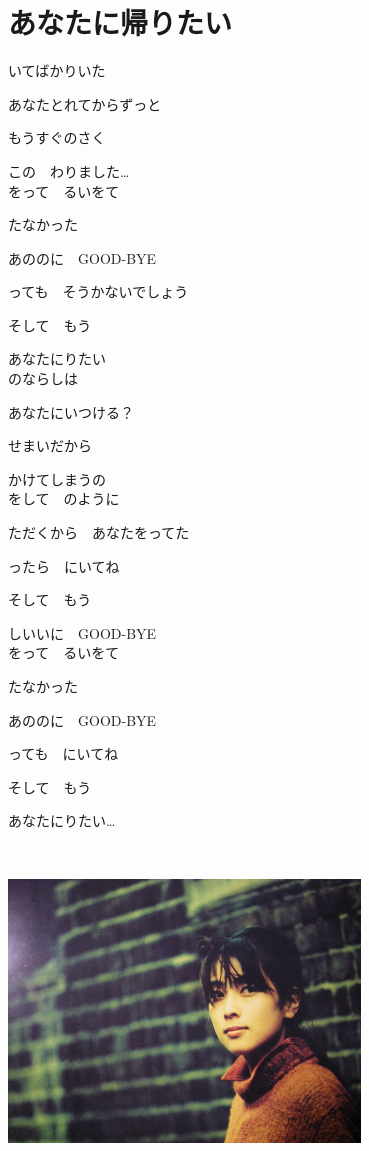 \section{ あなたに帰りたい}
\large{

いてばかりいた

あなたとれてからずっと

もうすぐのさく

この　わりました…
\\

をって　るいをて

たなかった

あののに　GOOD-BYE

っても　そうかないでしょう

そして　もう

あなたにりたい
\\

のならしは

あなたにいつける？

せまいだから

かけてしまうの
\\

をして　のように

ただくから　あなたをってた

ったら　にいてね

そして　もう

しいいに　GOOD-BYE
\\

をって　るいをて

たなかった

あののに　GOOD-BYE

っても　にいてね

そして　もう

あなたにりたい…

}
{ \ }

\includegraphics[width=0.7\textwidth]{P2.jpg}